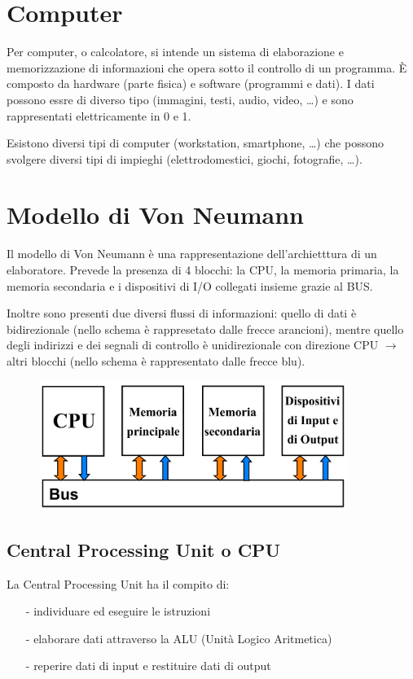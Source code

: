 \documentclass[a4paper]{article}
\begin{document}
\newpage


\section{Computer}
Per computer, o calcolatore, si intende un sistema di elaborazione e memorizzazione di informazioni che opera sotto
il controllo di un programma. È composto da hardware (parte fisica) e software (programmi e dati). I dati possono
essre di diverso tipo (immagini, testi, audio, video, \dots) e sono rappresentati elettricamente in 0 e 1.

Esistono diversi tipi di computer (workstation, smartphone, \dots) che possono svolgere diversi tipi di impieghi
(elettrodomestici, giochi, fotografie, \dots).


\section{Modello di Von Neumann}
Il modello di Von Neumann è una rappresentazione dell'archietttura di un elaboratore. Prevede la presenza di 4 blocchi:
la CPU, la memoria primaria, la memoria secondaria e i dispositivi di I/O collegati insieme grazie al BUS.

Inoltre sono presenti due diversi flussi di informazioni: quello di dati è bidirezionale (nello schema è rappresetato
dalle frecce arancioni), mentre quello degli indirizzi e dei segnali di controllo è unidirezionale con direzione CPU
\(\rightarrow\) altri blocchi (nello schema è rappresentato dalle frecce blu).

\begin{figure}[h]
	\centering
	\includegraphics[width=10cm]{von-neumann-scheme.png}
\end{figure}

\subsection{Central Processing Unit o CPU}
La Central Processing Unit ha il compito di:
\begin{itemize}[topsep=3pt, itemsep=0pt]
	\item[-] individuare ed eseguire le istruzioni
	\item[-] elaborare dati attraverso la ALU (Unità Logico Aritmetica)
	\item[-] reperire dati di input e restituire dati di output
\end{itemize}
\end{document}
